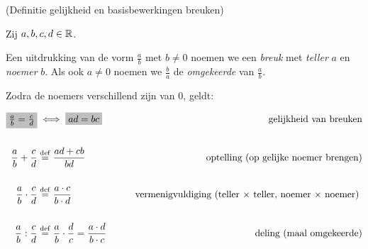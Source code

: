 \documentclass{ximera}
\begin{document}
\begin{definition} (Definitie gelijkheid en basisbewerkingen breuken)
	
Zij $a,b,c,d\in \mathbb{R}$. 

Een uitdrukking van de vorm $\frac ab$ met $b\neq0$ noemen we een \textit{breuk} met \textit{teller} $a$ en \textit{noemer} $b$. Als ook $a\neq0$ noemen we $\frac ba$ de \textit{omgekeerde} van $\frac ab$. 

Zodra de noemers verschillend zijn van $0$, geldt:

\begin{align*}
		\important{\frac{a}{b} = \frac{c}{d}}  &\iff \important{ad = bc} 
			& \tag*{gelijkheid van breuken}\label{def: gelijkheid breuken}\\ \\
		\frac{a}{b}+\frac{c}{d} &\perdef \frac{ad+cb}{bd} 
			& \tag*{ optelling (op gelijke noemer brengen)}\label{def:optelling breuken} \\ \\
		\frac{a}{b} \cdot \frac{c}{d} &\perdef \frac{a\cdot c}{b\cdot d} 
			& \tag*{vermenigvuldiging (teller $\times$ teller, noemer $\times$ noemer) }\label{def: vermenigvuldiging breuken} \\ \\
		\frac{a}{b} : \frac{c}{d} &\perdef \frac ab \cdot \frac dc = \frac{a\cdot d}{b\cdot c} 
		& \tag*{deling (maal omgekeerde)}\label {def: deling breuken}  \\
\end{align*}

\end{definition}
\end{document}
